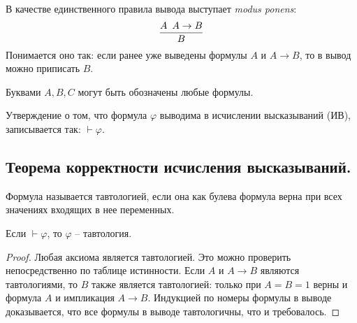 В качестве единственного правила вывода выступает \textit{modus ponens}:
\[
  \frac{A \hspace{0.5em} A \to B}{B}
\]
Понимается оно так: если ранее уже выведены формулы $A$ и $A \to B$, то в вывод можно приписать $B$. \newline

Буквами $A,B,C$ могут быть обозначены любые формулы. \newline

Утверждение о том, что формула $\varphi$ выводима в исчислении высказываний (ИВ), записывается так: $\vdash \varphi$.

\subsection{Теорема корректности исчисления высказываний.}

\begin{definition}
  Формула называется тавтологией, если она как булева формула верна при всех значениях входящих в нее переменных.
\end{definition}

\begin{theorem}
  Если $\vdash \varphi$, то $\varphi$ -- тавтология.
  \begin{proof}
    Любая аксиома является тавтологией. Это можно проверить непосредственно по таблице истинности. Если $A$ и $A \to B$ являются тавтологиями, то $B$ также является тавтологией: только при $A = B = 1$ верны и формула $A$ и импликация $A \to B$. Индукцией по номеры формулы в выводе доказывается, что все формулы в выводе тавтологичны, что и требовалось.
  \end{proof}
\end{theorem}